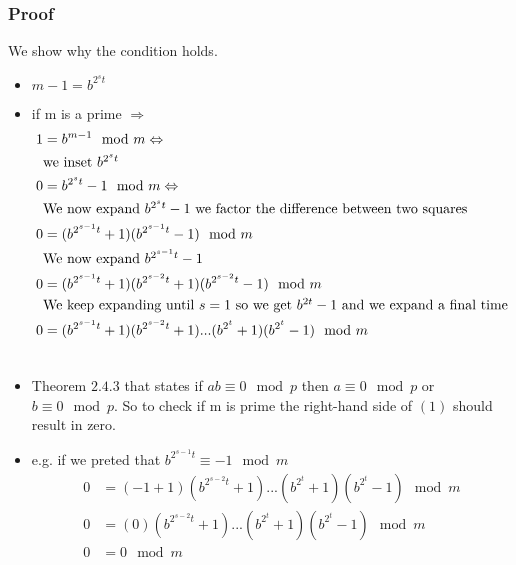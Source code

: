 \subsubsection*{Proof}
We show why the condition holds.
\begin{itemize}
\item $m-1=b^{2^st}$
\item if m is a prime $\Rightarrow$
\begin{align}
1&=b^{m-1}\mod m \Leftrightarrow\notag\\
&\mbox{we inset $b^{2^st}$}\notag\\
0&=b^{2^st}-1\mod m \Leftrightarrow\notag\\
&\mbox{We now expand $b^{2^st}-1$ we factor the difference between two squares}\notag \\
0&=(b^{2^{s-1}t}+1)(b^{2^{s-1}t}-1)\mod m\notag\\
&\mbox{We now expand $b^{2^{s-1}t}-1$}\notag\\
0&=(b^{2^{s-1}t}+1)(b^{2^{s-2}t}+1)(b^{2^{s-2}t}-1)\mod m\notag\\
&\mbox{We keep expanding until $s=1$ so we get $b^{2t}-1$ and we expand a final time}\notag\\
0&=(b^{2^{s-1}t}+1)(b^{2^{s-2}t}+1)...(b^{2^t}+1)(b^{2^t}-1)\mod m\\
\notag
\end{align}
\item Theorem $2.4.3$ that states if $ab\equiv 0 \mod p$ then $a\equiv 0 \mod p$ or $b\equiv 0 \mod p$. So to check if m is prime the right-hand side of $(1)$ should result in zero.
\item e.g. if we preted that $b^{2^{s-1}t}\equiv -1 \mod m$
\begin{align*}
0&=(-1+1)(b^{2^{s-2}t}+1)...(b^{2^t}+1)(b^{2^t}-1)\mod m\\
0&=(0)(b^{2^{s-2}t}+1)...(b^{2^t}+1)(b^{2^t}-1)\mod m\\
0&=0\mod m\\
\end{align*}
\end{itemize}